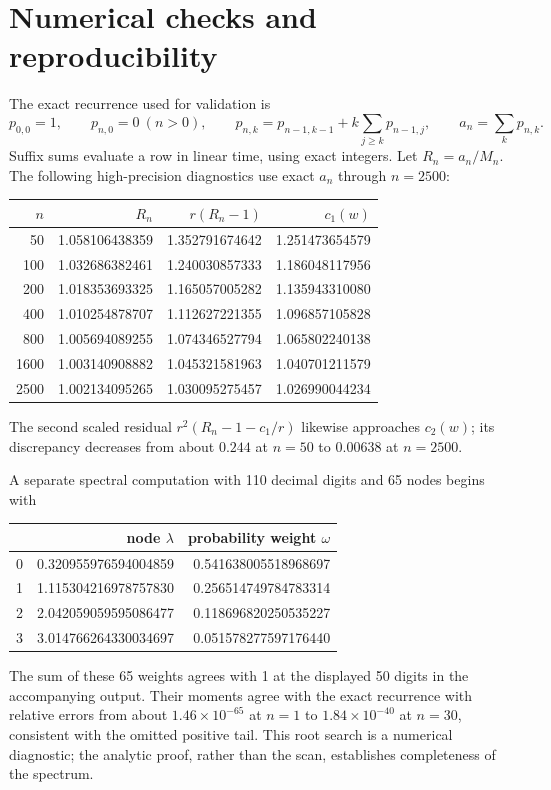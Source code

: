 \documentclass[11pt,letterpaper]{article}
\theoremstyle{remark}\newtheorem{remark}[theorem]{Remark}
\begin{document}
\section{Numerical checks and reproducibility}\label{pcn:sec:checks}
The exact recurrence used for validation is
\begin{equation}\label{pcn:eq:recurrence}
 p_{0,0}=1,\qquad p_{n,0}=0\ (n>0),\qquad
 p_{n,k}=p_{n-1,k-1}+k\sum_{j\ge k}p_{n-1,j},\qquad
 a_n=\sum_kp_{n,k}.
\end{equation}
Suffix sums evaluate a row in linear time, using exact integers. Let $R_n=a_n/M_n$. The following high-precision diagnostics use exact $a_n$ through $n=2500$:
\begin{center}
\begin{tabular}{r r r r}
\toprule
$n$ & $R_n$ & $r(R_n-1)$ & $c_1(w)$\\
\midrule
50   &1.058106438359&1.352791674642&1.251473654579\\
100  &1.032686382461&1.240030857333&1.186048117956\\
200  &1.018353693325&1.165057005282&1.135943310080\\
400  &1.010254878707&1.112627221355&1.096857105828\\
800  &1.005694089255&1.074346527794&1.065802240138\\
1600 &1.003140908882&1.045321581963&1.040701211579\\
2500 &1.002134095265&1.030095275457&1.026990044234\\
\bottomrule
\end{tabular}
\end{center}
The second scaled residual $r^2(R_n-1-c_1/r)$ likewise approaches $c_2(w)$; its discrepancy decreases from about $0.244$ at $n=50$ to $0.00638$ at $n=2500$.

A separate spectral computation with 110 decimal digits and 65 nodes begins with
\begin{center}
\begin{tabular}{r r r}
\toprule
 & node $\lambda$ & probability weight $\omega$\\
\midrule
0&0.320955976594004859&0.541638005518968697\\
1&1.115304216978757830&0.256514749784783314\\
2&2.042059059595086477&0.118696820250535227\\
3&3.014766264330034697&0.051578277597176440\\
\bottomrule
\end{tabular}
\end{center}
The sum of these 65 weights agrees with 1 at the displayed 50 digits in the accompanying output. Their moments agree with the exact recurrence with relative errors from about $1.46\times10^{-65}$ at $n=1$ to $1.84\times10^{-40}$ at $n=30$, consistent with the omitted positive tail. This root search is a numerical diagnostic; the analytic proof, rather than the scan, establishes completeness of the spectrum.
\end{document}
